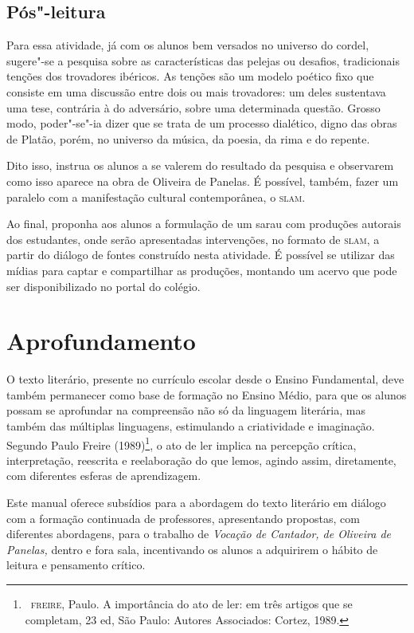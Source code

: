 \documentclass[12pt]{extarticle}
\begin{document}
\subsection{Pós"-leitura}

Para essa atividade, já com os alunos bem versados no
universo do cordel, sugere"-se a pesquisa sobre as características das
pelejas ou desafios, tradicionais tenções dos trovadores ibéricos. As
tenções são um modelo poético fixo que consiste em uma discussão entre
dois ou mais trovadores: um deles sustentava uma tese, contrária à do
adversário, sobre uma determinada questão. Grosso modo, poder"-se"-ia
dizer que se trata de um processo dialético, digno das obras de Platão,
porém, no universo da música, da poesia, da rima e do repente.

Dito isso, instrua os alunos a se valerem do resultado da pesquisa e
observarem como isso aparece na obra de Oliveira de Panelas. É possível,
também, fazer um paralelo com a manifestação cultural contemporânea, o
\textsc{slam}.

Ao final, proponha aos alunos a formulação de um sarau com produções
autorais dos estudantes, onde serão apresentadas intervenções, no
formato de \textsc{slam}, a partir do diálogo de fontes construído nesta
atividade. É possível se utilizar das mídias para captar e compartilhar
as produções, montando um acervo que pode ser disponibilizado no portal
do colégio.

\section{Aprofundamento}

O texto literário, presente no currículo escolar desde o Ensino
Fundamental, deve também permanecer como base de formação no Ensino
Médio, para que os alunos possam se aprofundar na compreensão não só da
linguagem literária, mas também das múltiplas linguagens, estimulando a
criatividade e imaginação. Segundo Paulo Freire (1989)\footnote{~\textsc{freire},
  Paulo. A importância do ato de ler: em três artigos que se completam,
  23 ed, São Paulo: Autores Associados: Cortez, 1989.}, o ato de ler
implica na percepção crítica, interpretação, reescrita e reelaboração do
que lemos, agindo assim, diretamente, com diferentes esferas de
aprendizagem.

Este manual oferece subsídios para a abordagem do texto literário em
diálogo com a formação continuada de professores, apresentando
propostas, com diferentes abordagens, para o trabalho de \emph{Vocação
de Cantador, de Oliveira de Panelas,} dentro e fora sala, incentivando
os alunos a adquirirem o hábito de leitura e pensamento crítico.
\end{document}
